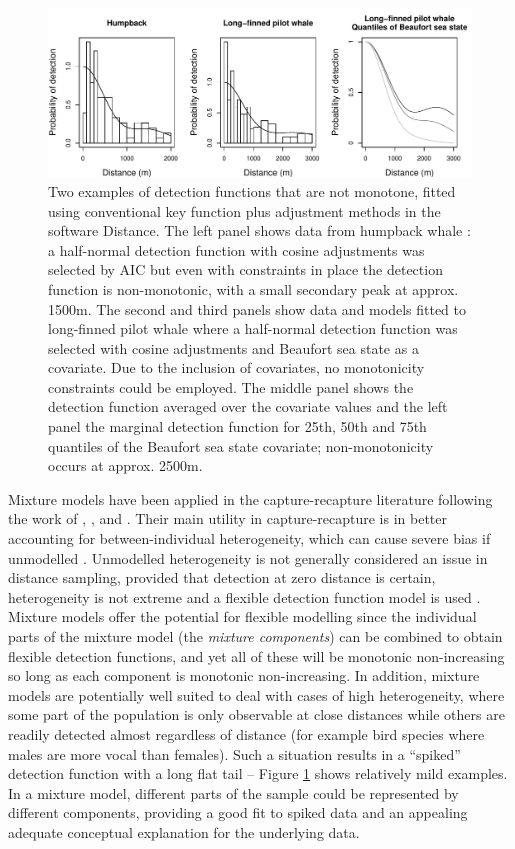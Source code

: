 \documentclass[useAMS,referee,usenatbib]{biom}
\begin{document}
\begin{figure}
\centering
\includegraphics[width=\textwidth]{figs/figure1.pdf}
\caption{Two examples of detection functions that are not monotone, fitted using conventional key function plus adjustment methods in the software Distance. The left panel shows data from humpback whale \citep{Williams:2007tc}: a half-normal detection function with cosine adjustments was selected by AIC but even with constraints in place the detection function is non-monotonic, with a small secondary peak at approx. 1500m. The second and third panels show data and models fitted to long-finned pilot whale \citep{Pike:2003ug} where a half-normal detection function was selected with cosine adjustments and Beaufort sea state as a covariate. Due to the inclusion of covariates, no monotonicity constraints could be employed.  The middle panel shows the detection function averaged over the covariate values and the left panel the marginal detection function for 25th, 50th and 75th quantiles of the Beaufort sea state covariate; non-monotonicity occurs at approx. 2500m.}
\label{fig1}
\end{figure}

Mixture models have been applied in the capture-recapture literature following the work of \cite{Pledger:2000tc}, \cite{Dorazio:2003uf}, \cite{Pledger:2005wy} and \cite{Morgan:2008wy}. Their main utility in capture-recapture is in better accounting for between-individual heterogeneity, which can cause severe bias if unmodelled \citep{Link:2003wo}. Unmodelled heterogeneity is not generally considered an issue in distance sampling, provided that detection at zero distance is certain, heterogeneity is not extreme and a flexible detection function model is used \citep[][Section 11.12]{Buckland:2004ts}. Mixture models offer the potential for flexible modelling since the individual parts of the mixture model (the \textit{mixture components}) can be combined to obtain flexible detection functions, and yet all of these will be monotonic non-increasing so long as each component is monotonic non-increasing. In addition, mixture models are potentially well suited to deal with cases of high heterogeneity, where some part of the population is only observable at close distances while others are readily detected almost regardless of distance (for example bird species where males are more vocal than females). Such a situation results in a ``spiked'' detection function with a long flat tail -- Figure \ref{fig1} shows relatively mild examples. In a mixture model, different parts of the sample could be represented by different components, providing a good fit to spiked data and an appealing adequate conceptual explanation for the underlying data.
\end{document}
